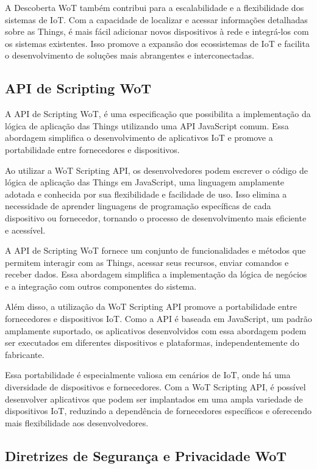 A Descoberta WoT também contribui para a escalabilidade e a flexibilidade dos sistemas de IoT. Com a capacidade de localizar e acessar informações detalhadas sobre as Things, é mais fácil adicionar novos dispositivos à rede e integrá-los com os sistemas existentes. Isso promove a expansão dos ecossistemas de IoT e facilita o desenvolvimento de soluções mais abrangentes e interconectadas.

\subsection{API de Scripting WoT}

A API de Scripting WoT, é uma especificação que possibilita a implementação da lógica de aplicação das Things utilizando uma API JavaScript comum. Essa abordagem simplifica o desenvolvimento de aplicativos IoT e promove a portabilidade entre fornecedores e dispositivos.

Ao utilizar a WoT Scripting API, os desenvolvedores podem escrever o código de lógica de aplicação das Things em JavaScript, uma linguagem amplamente adotada e conhecida por sua flexibilidade e facilidade de uso. Isso elimina a necessidade de aprender linguagens de programação específicas de cada dispositivo ou fornecedor, tornando o processo de desenvolvimento mais eficiente e acessível.

A API de Scripting WoT fornece um conjunto de funcionalidades e métodos que permitem interagir com as Things, acessar seus recursos, enviar comandos e receber dados. Essa abordagem simplifica a implementação da lógica de negócios e a integração com outros componentes do sistema.

Além disso, a utilização da WoT Scripting API promove a portabilidade entre fornecedores e dispositivos IoT. Como a API é baseada em JavaScript, um padrão amplamente suportado, os aplicativos desenvolvidos com essa abordagem podem ser executados em diferentes dispositivos e plataformas, independentemente do fabricante.

Essa portabilidade é especialmente valiosa em cenários de IoT, onde há uma diversidade de dispositivos e fornecedores. Com a WoT Scripting API, é possível desenvolver aplicativos que podem ser implantados em uma ampla variedade de dispositivos IoT, reduzindo a dependência de fornecedores específicos e oferecendo mais flexibilidade aos desenvolvedores.

\subsection{Diretrizes de Segurança e Privacidade WoT}

